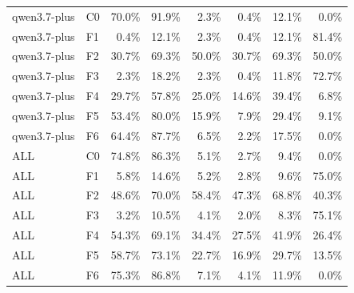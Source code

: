 \begin{tabular}{llrrrrrr}
qwen3.7-plus & C0 & 70.0\% & 91.9\% & 2.3\% & 0.4\% & 12.1\% & 0.0\% \\
qwen3.7-plus & F1 & 0.4\% & 12.1\% & 2.3\% & 0.4\% & 12.1\% & 81.4\% \\
qwen3.7-plus & F2 & 30.7\% & 69.3\% & 50.0\% & 30.7\% & 69.3\% & 50.0\% \\
qwen3.7-plus & F3 & 2.3\% & 18.2\% & 2.3\% & 0.4\% & 11.8\% & 72.7\% \\
qwen3.7-plus & F4 & 29.7\% & 57.8\% & 25.0\% & 14.6\% & 39.4\% & 6.8\% \\
qwen3.7-plus & F5 & 53.4\% & 80.0\% & 15.9\% & 7.9\% & 29.4\% & 9.1\% \\
qwen3.7-plus & F6 & 64.4\% & 87.7\% & 6.5\% & 2.2\% & 17.5\% & 0.0\% \\
ALL & C0 & 74.8\% & 86.3\% & 5.1\% & 2.7\% & 9.4\% & 0.0\% \\
ALL & F1 & 5.8\% & 14.6\% & 5.2\% & 2.8\% & 9.6\% & 75.0\% \\
ALL & F2 & 48.6\% & 70.0\% & 58.4\% & 47.3\% & 68.8\% & 40.3\% \\
ALL & F3 & 3.2\% & 10.5\% & 4.1\% & 2.0\% & 8.3\% & 75.1\% \\
ALL & F4 & 54.3\% & 69.1\% & 34.4\% & 27.5\% & 41.9\% & 26.4\% \\
ALL & F5 & 58.7\% & 73.1\% & 22.7\% & 16.9\% & 29.7\% & 13.5\% \\
ALL & F6 & 75.3\% & 86.8\% & 7.1\% & 4.1\% & 11.9\% & 0.0\% \\
\bottomrule
\end{tabular}

